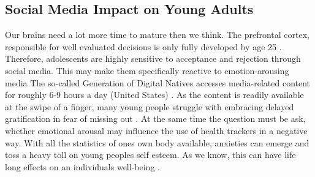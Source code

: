 \subsection{Social Media Impact on Young Adults}
Our brains need a lot more time to mature then we think. The prefrontal cortex, responsible for well evaluated decisions is only fully developed by age 25 \cite{prefrontalCortexDev}. Therefore, adolescents are highly sensitive to acceptance and rejection through social media. This may make them specifically reactive to emotion-arousing media The so-called Generation of Digital Natives accesses media-related content for roughly 6-9 hours a day (United States) \cite{crone2018media}. As the content is readily available at the swipe of a finger, many young people struggle with embracing delayed gratification in fear of missing out \cite{oberst2017negative}. At the same time the question must be ask, whether emotional arousal may influence the use of health trackers in a negative way. With all the statistics of ones own body available, anxieties can emerge and toss a heavy toll on young peoples self esteem. As we know, this can have life long effects on an individuals well-being \cite{mykletun2006mortality}.

